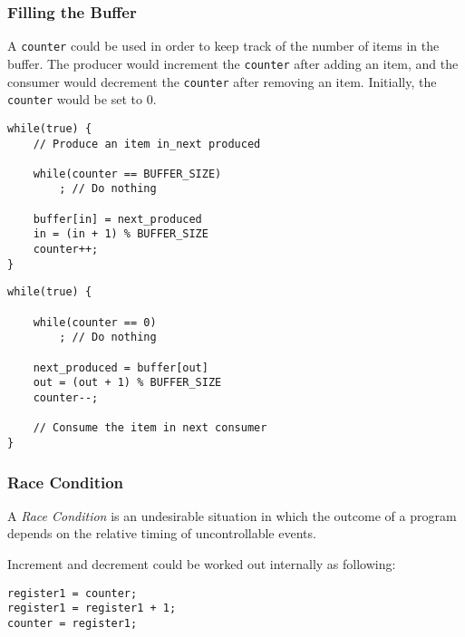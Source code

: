\documentclass[]{article}
\begin{document}
\subsubsection*{Filling the Buffer}

A \verb|counter| could be used in order to keep track of the number of items in the buffer. The producer would increment the \verb|counter| after adding an item, and the consumer would decrement the \verb|counter| after removing an item. Initially, the \verb|counter| would be set to 0.

\begin{tcolorbox}[title = Producer with Counter]
\begin{verbatim}
while(true) {
    // Produce an item in_next produced

    while(counter == BUFFER_SIZE)
        ; // Do nothing

    buffer[in] = next_produced
    in = (in + 1) % BUFFER_SIZE
    counter++;
}
\end{verbatim}
\end{tcolorbox}

\begin{tcolorbox}[title = Consumer with Counter]
\begin{verbatim}
while(true) {

    while(counter == 0) 
        ; // Do nothing

    next_produced = buffer[out]
    out = (out + 1) % BUFFER_SIZE
    counter--;

    // Consume the item in next consumer
}
\end{verbatim}
\end{tcolorbox}

\pagebreak

\subsubsection*{Race Condition}

A \emph{Race Condition} is an undesirable situation in which the outcome of a program depends on the relative timing of uncontrollable events.

Increment and decrement could be worked out internally as following:

\begin{tcolorbox}[title = Increment]
\begin{verbatim}
register1 = counter;
register1 = register1 + 1;
counter = register1;
\end{verbatim}
\end{tcolorbox}
\end{document}
